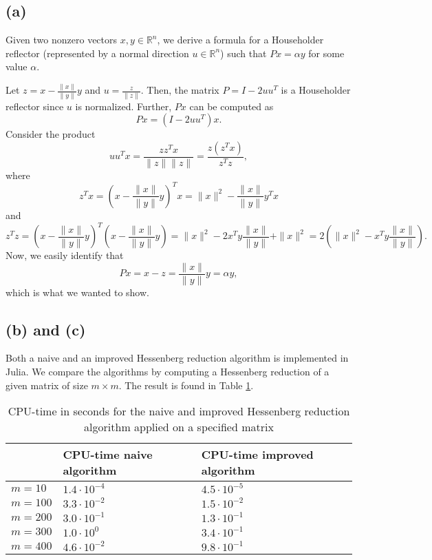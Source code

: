 
\subsection*{(a)}
Given two nonzero vectors $x,y\in \mathbb R^n$, we derive a formula for a Householder reflector (represented by a normal direction $u\in\mathbb R^n$) such that $Px = \alpha y$ for some value $\alpha$.

Let $z = x-\frac{\|x\|}{\|y\|}y$ and $u = \frac{z}{\|z\|}$. Then, the matrix $P = I-2uu^T$ is a Householder reflector since $u$ is normalized. Further, $Px$ can be computed as
\begin{equation}
Px = (I-2uu^T)x.
\end{equation}
Consider the product
\begin{equation}
uu^Tx = \frac{zz^Tx}{\|z\|\|z\|} = \frac{z(z^Tx)}{z^Tz},
\end{equation}
where
\begin{equation}
z^Tx = \left(x-\frac{\|x\|}{\|y\|}y\right)^Tx = \|x\|^2-\frac{\|x\|}{\|y\|}y^Tx
\end{equation}
and
\begin{equation}
z^Tz = \left(x-\frac{\|x\|}{\|y\|}y\right)^T\left(x-\frac{\|x\|}{\|y\|}y\right)=\|x\|^2-2x^Ty\frac{\|x\|}{\|y\|}+\|x\|^2 = 2\left(\|x\|^2-x^Ty\frac{\|x\|}{\|y\|}\right).
\end{equation}
Now, we easily identify that
\begin{equation}
Px = x-z =\frac{\|x\|}{\|y\|}y = \alpha y,
\end{equation}
which is what we wanted to show.
\subsection*{(b) and (c)}
Both a naive and an improved Hessenberg reduction algorithm is implemented in Julia. We compare the algorithms by computing a Hessenberg reduction of a given matrix of size $m\times m$. The result is found in Table \ref{task3}.
\begin{table}[h!]
	\centering
	\caption{CPU-time in seconds for the naive and improved Hessenberg reduction algorithm applied on a specified matrix}
	\label{task3}
	\begin{tabular}{l | l | l }
		& CPU-time naive algorithm & CPU-time improved algorithm \\ \hline\hline
		$m = 10$ & $1.4\cdot 10^{-4}$ & $4.5\cdot 10^{-5}$\\ \hline
		$m = 100$ & $3.3\cdot 10^{-2}$ & $ 1.5\cdot 10^{-2}$\\  \hline
		$m = 200$ & $3.0\cdot 10^{-1}$ & $ 1.3\cdot 10^{-1}$\\  \hline
		$m = 300$ & $1.0\cdot 10^{0}$ & $ 3.4\cdot 10^{-1}$\\  \hline
		$m = 400$ & $4.6\cdot 10^{-2}$ & $ 9.8\cdot 10^{-1}$\\  \hline
	\end{tabular}
\end{table}

